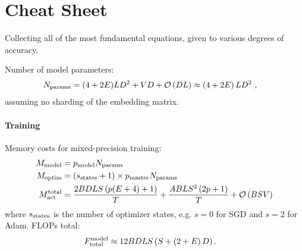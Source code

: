 \section{Cheat Sheet \label{app_cheat_sheet}}
Collecting all of the most fundamental equations, given to various degrees of accuracy.

Number of model parameters:
\begin{align}
	N _{ {\rm params} } & =   (4+2E)LD ^{ 2 } + VD+ \mathcal{O} \left( DL \right) \approx   \left ( 4+2E \right )LD ^{ 2 }\ ,
\end{align}
assuming no sharding of the embedding matrix.


\paragraph{Training}

Memory costs for mixed-precision training:
\begin{align}
	M _{ {\rm model} }                   & =p _{ {\rm model} } N _{ {\rm params} } \nonumber\\
	M _{ {\rm optim} }                   & =  \left ( s _{ {\rm states} }+1 \right) \times p _{ {\rm master } } N _{ {\rm params} } \nonumber\\
	M _{ {\rm act}  } ^{ {\rm  total}  } & =\frac{ 2BDLS   \left ( p(E+4) + 1   \right ) }{ T }
	+ \frac{ ABLS ^{ 2 } \left ( 2p+1\right ) }{ T }  + \mathcal{O} \left( BSV \right)
\end{align}
where $ s _{ {\rm  states} } $ is the number of optimizer states, e.g. $ s=0 $ for SGD and $ s=2 $
for Adam. FLOPs total:
\begin{align}
	F _{ {\rm total}  } ^{ {\rm  model}  } & \approx 12 BDLS \left ( S + \left ( 2+E \right )D \right ) .
\end{align}


